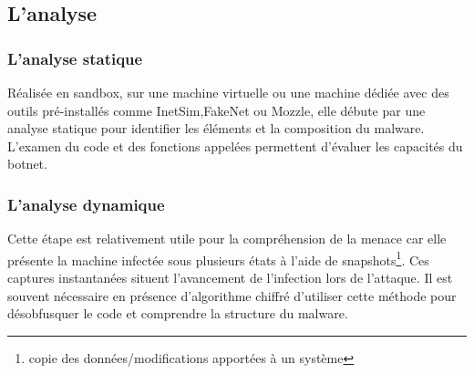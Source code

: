 \subsection{L'analyse} 
\subsubsection{L'analyse statique}
Réalisée en sandbox, sur une machine virtuelle ou une machine dédiée avec des outils pré-installés comme InetSim,FakeNet ou Mozzle, elle débute par une analyse statique pour identifier les éléments et la composition du malware.
L'examen du code et des fonctions appelées permettent d'évaluer les capacités du botnet.
\subsubsection{L'analyse dynamique} 
Cette étape est relativement utile pour la compréhension de la menace car elle présente la machine infectée sous plusieurs états à l'aide de snapshots\footnote{copie des données/modifications apportées à un système}.
Ces captures instantanées situent l'avancement de l'infection lors de l'attaque.
Il est souvent nécessaire en présence d'algorithme chiffré d'utiliser cette méthode pour désobfusquer le code et comprendre la structure du malware.


